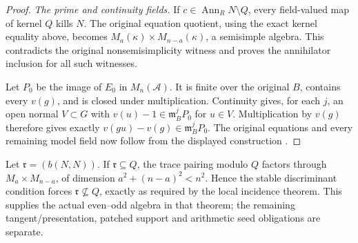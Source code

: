 \begin{proof}
\emph{The prime and continuity fields.}
If \(c\in\operatorname{Ann}_R N\setminus Q\), every field-valued
map of kernel \(Q\) kills \(N\).  The original equation quotient,
using the exact kernel equality above, becomes
\(M_a(\kappa)\times M_{n-a}(\kappa)\), a semisimple algebra.
This contradicts the original nonsemisimplicity witness and
proves the annihilator inclusion for all such witnesses.

Let \(P_0\) be the image of \(E_0\) in \(M_n(\mathcal A)\).
It is finite over the original \(B\), contains every \(v(g)\),
and is closed under multiplication.  Continuity gives, for
each \(j\), an open normal \(V\subset G\) with
\(v(u)-1\in\mathfrak m_B^jP_0\) for \(u\in V\).
Multiplication by \(v(g)\) therefore gives exactly
\(v(gu)-v(g)\in\mathfrak m_B^jP_0\).
The original equations and every remaining model field now follow
from the displayed construction \cite{SelmerModelSource}.
\end{proof}

Let \(\mathfrak r=(b(N,N))\).  If
\(\mathfrak r\subseteq Q\), the trace pairing modulo \(Q\)
factors through \(M_a\times M_{n-a}\), of dimension
\(a^2+(n-a)^2<n^2\).  Hence the stable discriminant condition
forces \(\mathfrak r\nsubseteq Q\), exactly as required by the
local incidence theorem.  This supplies the actual even--odd
algebra in that theorem; the remaining tangent/presentation,
patched support and arithmetic seed obligations are separate.

